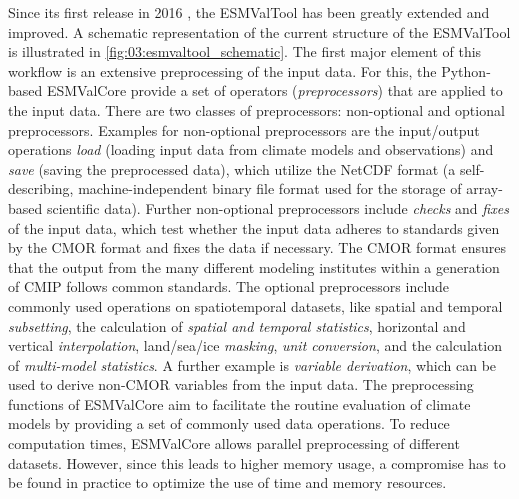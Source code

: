 Since its first release in 2016 \autocite{Eyring2016a}, the \ac{ESMValTool} has
been greatly extended and improved. A schematic representation of the current
structure of the \ac{ESMValTool} is illustrated in
\cref{fig:03:esmvaltool_schematic}. The first major element of this workflow is
an extensive preprocessing of the input data. For this, the Python-based
\acf{ESMValCore} provide a set of operators (\emph{preprocessors}) that are
applied to the input data. There are two classes of preprocessors: non-optional
and optional preprocessors. Examples for non-optional preprocessors are the
input/output operations \emph{load} (loading input data from climate models and
observations) and \emph{save} (saving the preprocessed data), which utilize the
\ac{NetCDF} format (a self-describing, machine-independent binary file format
used for the storage of array-based scientific data). Further non-optional
preprocessors include \emph{checks} and \emph{fixes} of the input data, which
test whether the input data adheres to standards given by the \ac{CMOR} format
and fixes the data if necessary. The \ac{CMOR} format ensures that the output
from the many different modeling institutes within a generation of \ac{CMIP}
follows common standards. The optional preprocessors include commonly used
operations on spatiotemporal datasets, like spatial and temporal
\emph{subsetting}, the calculation of \emph{spatial and temporal statistics},
horizontal and vertical \emph{interpolation}, land/sea/ice \emph{masking},
\emph{unit conversion}, and the calculation of \emph{multi-model statistics}. A
further example is \emph{variable derivation}, which can be used to derive
non-\ac{CMOR} variables from the input data. The preprocessing functions of
\ac{ESMValCore} aim to facilitate the routine evaluation of climate models by
providing a set of commonly used data operations. To reduce computation times,
\ac{ESMValCore} allows parallel preprocessing of different datasets. However,
since this leads to higher memory usage, a compromise has to be found in
practice to optimize the use of time and memory resources.

